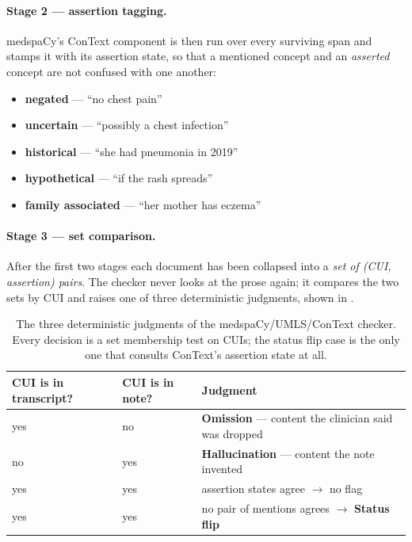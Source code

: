 \paragraph{Stage 2 --- assertion tagging.}
medspaCy's ConText component is then run over every surviving span and stamps it
with its assertion state, so that a mentioned concept and an \emph{asserted}
concept are not confused with one another:
\begin{itemize}
    \item \textbf{negated} --- ``no chest pain''
    \item \textbf{uncertain} --- ``possibly a chest infection''
    \item \textbf{historical} --- ``she had pneumonia in 2019''
    \item \textbf{hypothetical} --- ``if the rash spreads''
    \item \textbf{family associated} --- ``her mother has eczema''
\end{itemize}

\paragraph{Stage 3 --- set comparison.}
After the first two stages each document has been collapsed into a
\emph{set of (CUI, assertion) pairs}. The checker never looks at the prose
again; it compares the two sets by CUI and raises one of three deterministic
judgments, shown in .

\begin{table}[htbp]
  \centering
  \begin{tabular}{lll}
    \toprule
    \textbf{CUI is in transcript?} & \textbf{CUI is in note?} & \textbf{Judgment} \\
    \midrule
    yes & no  & \textbf{Omission} --- content the clinician said was dropped \\
    no  & yes & \textbf{Hallucination} --- content the note invented \\
    yes & yes & assertion states agree $\rightarrow$ no flag \\
    yes & yes & no pair of mentions agrees $\rightarrow$ \textbf{Status flip} \\
    \bottomrule
  \end{tabular}
  \caption{The three deterministic judgments of the medspaCy/UMLS/ConText checker.
  Every decision is a set membership test on CUIs; the status flip case is the only
  one that consults ConText's assertion state at all.}
  \label{tab:medspacy_decision}
\end{table}

